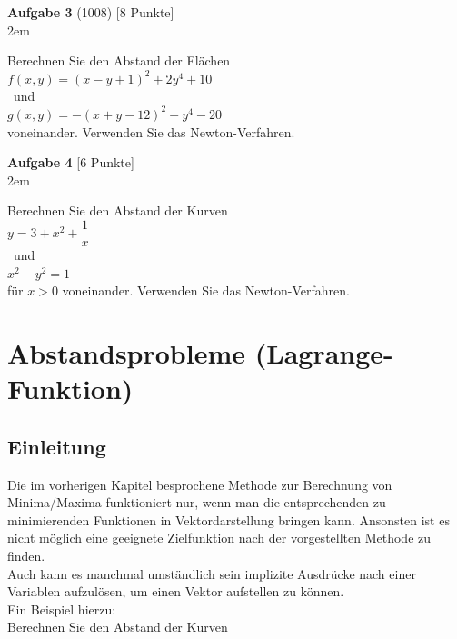 \documentclass[11pt,final]{scrreprt}
\begin{document}
\par	
\endgroup

\textbf{Aufgabe 3} (1008) [8 Punkte]\\

\begingroup
\leftskip2em 

Berechnen Sie den Abstand der Flächen\\
$ f(x, y) = (x-y+1)^2+2y^4+10$\\\
und\\
$ g(x, y) = -(x+y-12)^2-y^4-20$\\
voneinander. Verwenden Sie das Newton-Verfahren.\\

\par	
\endgroup

\textbf{Aufgabe 4} [6 Punkte]\\

\begingroup
\leftskip2em 

Berechnen Sie den Abstand der Kurven\\
$ y=3+x^2+\dfrac{1}{x}$\\\
und\\
$ x^2-y^2=1$\\
für $x>0$ voneinander. Verwenden Sie das Newton-Verfahren.\\

\par	
\endgroup

\chapter{Abstandsprobleme (Lagrange-Funktion)}

\section{Einleitung}
Die im vorherigen Kapitel besprochene Methode zur Berechnung von Minima/Maxima funktioniert nur, wenn man die entsprechenden zu minimierenden Funktionen in Vektordarstellung bringen kann. Ansonsten ist es nicht möglich eine geeignete Zielfunktion nach der vorgestellten Methode zu finden.\\
Auch kann es manchmal umständlich sein implizite Ausdrücke nach einer Variablen aufzulösen, um einen Vektor aufstellen zu können.\\

Ein Beispiel hierzu:\\

Berechnen Sie den Abstand der Kurven
\end{document}
